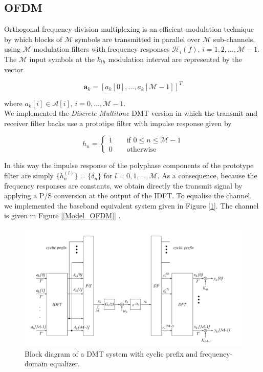 \documentclass[a4paper, 12pt]{report}
\begin{document}
\clearpage
\subsection*{OFDM}
Orthogonal frequency division multiplexing is an efficient modulation technique by which blocks of $\mathcal{M}$ symbols are transmitted in parallel over $\mathcal{M}$ sub-channels, using $\mathcal{M}$ modulation filters with frequency responses $\mathcal{H}_i(f)$, $i=1,2,\dots,\mathcal{M}-1$. The $\mathcal{M}$ input symbols at the $k_{th}$ modulation interval are represented by the vector

\begin{equation}
\mathbf{a}_k = [a_k[0],\dots,a_k[\mathcal{M}-1]]^T
\end{equation}

where $a_k[i]\in\mathcal{A}[i]$, $i=0,\dots,\mathcal{M}-1$.\\
We implemented the \textit{Discrete Multitone} DMT version in which the transmit and receiver filter backs use a prototipe filter with impulse response given by

\begin{equation}
h_n = \begin{cases}
		1 \quad\quad \text{if } 0\le n\le\mathcal{M}-1 \\
		0 \quad\quad \text{otherwise}
\end{cases}
\end{equation}

In this way the impulse response of the polyphase components of the prototype filter are simply $\{ h_n^{(l)}\}=\{\delta_n\}$ for $l=0,1,\dots,\mathcal{M}$. As a consequence, because the frequency responses are constants, we obtain directly the transmit signal by applying a P/S conversion at the output of the IDFT. To equalise the channel, we implemented the baseband equivalent system given in Figure [\ref{ofdm}]. The channel is given in Figure [\ref{Model_OFDM}]
.
\begin{figure}[H]
	\centering
	\includegraphics[width=14cm]{OFDM}
	\caption{Block diagram of a DMT system with cyclic prefix and frequency-domain equalizer.}\label{ofdm}
\end{figure}
\end{document}
